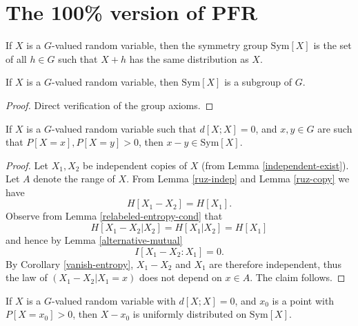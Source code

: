 \chapter{The 100\% version of PFR}

\begin{definition}\label{sym-group-def}
\leanok
If $X$ is a $G$-valued random variable, then the symmetry group $\mathrm{Sym}[X]$ is the set of all $h \in G$ such that $X+h$ has the same distribution as $X$.
\end{definition}

\begin{lemma}\label{sym-group}
\leanok
If $X$ is a $G$-valued random variable, then $\mathrm{Sym}[X]$ is a subgroup of $G$.
\end{lemma}

\begin{proof}\leanok Direct verification of the group axioms.
\end{proof}

\begin{lemma}\label{zero-large}
  \leanok  If $X$ is a $G$-valued random variable such that
  $d[X;X]=0$, and $x,y \in G$ are such that $P[X=x], P[X=y]>0$, then $x-y \in \mathrm{Sym}[X]$.
\end{lemma}

\begin{proof}
  \leanok
   Let $X_1,X_2$ be independent copies of $X$ (from Lemma \ref{independent-exist}). Let $A$ denote the range of $X$.  From Lemma \ref{ruz-indep} and Lemma \ref{ruz-copy} we have
  $$ H[X_1-X_2] = H[X_1].$$
Observe from Lemma \ref{relabeled-entropy-cond} that
$$ H[X_1-X_2|X_2] = H[X_1|X_2] = H[X_1]$$
and hence by Lemma \ref{alternative-mutual}
$$ I[ X_1-X_2 : X_1 ] = 0.$$
By Corollary \ref{vanish-entropy}, $X_1-X_2$ and $X_1$ are therefore independent, thus the law of $(X_1-X_2|X_1=x)$ does not depend on $x \in A$. The claim follows.
\end{proof}

\begin{lemma}\label{sym-zero}
\leanok
  If $X$ is a $G$-valued random variable with $d[X;X]=0$, and $x_0$ is a point with $P[X=x_0] > 0$, then $X-x_0$ is uniformly distributed on $\mathrm{Sym}[X]$.
\end{lemma}

